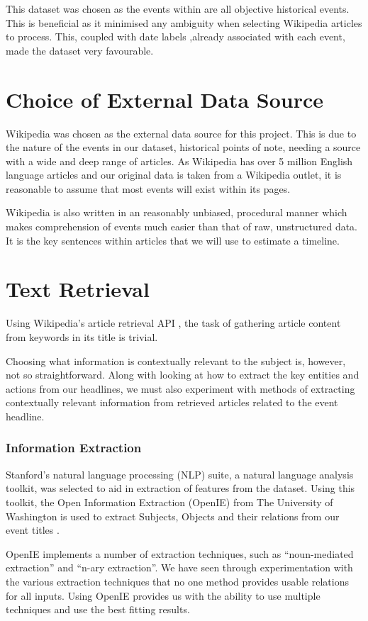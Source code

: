 \documentclass[bsc,frontabs,twoside,singlespacing,parskip,deptreport]{infthesis}     %
\begin{document}
This dataset was chosen as the events within are all objective historical events. This is beneficial as it minimised
any ambiguity when selecting Wikipedia articles to process. This, coupled with date labels ,already associated with
each event, made the dataset very favourable.


\section{Choice of External Data Source}
Wikipedia was chosen as the external data source for this project.
This is due to the nature of the events in our dataset, historical points of note,
needing a source with a wide and deep range of articles.
As Wikipedia has over 5 million English language articles \cite{wikipedaisize} and our original data
is taken from a Wikipedia outlet, it is reasonable to assume
that most events will exist within its pages.


Wikipedia is also written in an reasonably unbiased, procedural manner which makes comprehension of events much
easier than that of raw, unstructured data.
It is the key sentences within articles that we will use to estimate a timeline.

\section{Text Retrieval}
Using Wikipedia's article retrieval API \cite{wikipediaAPI}, the task of gathering article content
from keywords in its title is trivial.

Choosing what information is contextually relevant to the subject is, however, not so straightforward.
Along with looking at how to extract the key entities and actions from our 
headlines, we must also experiment with methods of extracting contextually relevant information from
retrieved articles related to the event headline.

\subsubsection{Information Extraction}
Stanford's natural language processing (NLP) suite,
a natural language analysis toolkit,
was selected to aid in extraction of features from the dataset.
Using this toolkit, the Open Information Extraction (OpenIE) from
The University of Washington is used to extract Subjects, Objects
and their relations from our event titles \cite{schmitz2012open}.


OpenIE implements a number of extraction techniques, such as ``noun-mediated extraction'' and ``n-ary extraction''.
We have seen through experimentation with the various extraction techniques that no one method provides
usable relations for all inputs. Using OpenIE provides us with the ability to use multiple techniques and
use the best fitting results.
\end{document}

